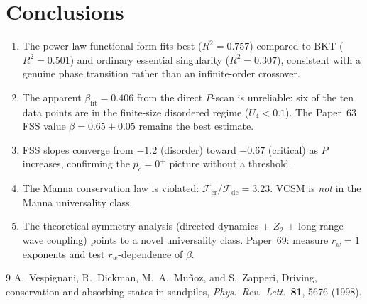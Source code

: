 \documentclass[twocolumn,10pt]{article}
\begin{document}
\section{Conclusions}

\begin{enumerate}
  \item The power-law functional form fits best ($R^2 = 0.757$) compared to
        BKT ($R^2 = 0.501$) and ordinary essential singularity ($R^2 = 0.307$),
        consistent with a genuine phase transition rather than an infinite-order
        crossover.
  \item The apparent $\beta_\mathrm{fit} = 0.406$ from the direct $P$-scan is
        unreliable: six of the ten data points are in the finite-size disordered
        regime ($U_4 < 0.1$).
        The Paper~63 FSS value $\beta = 0.65 \pm 0.05$ remains the best estimate.
  \item FSS slopes converge from $-1.2$ (disorder) toward $-0.67$ (critical)
        as $P$ increases, confirming the $p_c = 0^+$ picture without a threshold.
  \item The Manna conservation law is violated: $\mathcal{F}_\mathrm{cr}/\mathcal{F}_\mathrm{dc} = 3.23$.
        VCSM is \emph{not} in the Manna universality class.
  \item The theoretical symmetry analysis (directed dynamics + $Z_2$ + long-range
        wave coupling) points to a novel universality class.
        Paper~69: measure $r_w=1$ exponents and test $r_w$-dependence of $\beta$.
\end{enumerate}

\begin{thebibliography}{9}
  A.~Vespignani, R.~Dickman, M.~A.~Mu\~noz, and S.~Zapperi,
  Driving, conservation and absorbing states in sandpiles,
  \textit{Phys.\ Rev.\ Lett.}\ \textbf{81}, 5676 (1998).
\end{thebibliography}
\end{document}
